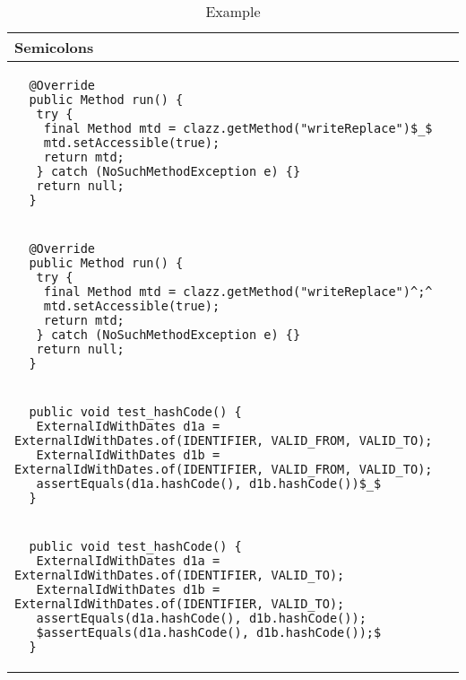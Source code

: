 \begin{table}[p]
\begin{tabular}{ | m{11cm} | }
  \hline
  Semicolons \\
  \hline
  \begin{lstlisting}
  @Override
  public Method run() {
   try {
    final Method mtd = clazz.getMethod("writeReplace")$_$
    mtd.setAccessible(true);
    return mtd;
   } catch (NoSuchMethodException e) {}
   return null;
  }
  \end{lstlisting} \\
  \begin{lstlisting}
  @Override
  public Method run() {
   try {
    final Method mtd = clazz.getMethod("writeReplace")^;^
    mtd.setAccessible(true);
    return mtd;
   } catch (NoSuchMethodException e) {}
   return null;
  }
  \end{lstlisting} \\
  \hline
  \hline
  \begin{lstlisting}
  public void test_hashCode() {
   ExternalIdWithDates d1a = ExternalIdWithDates.of(IDENTIFIER, VALID_FROM, VALID_TO);
   ExternalIdWithDates d1b = ExternalIdWithDates.of(IDENTIFIER, VALID_FROM, VALID_TO);
   assertEquals(d1a.hashCode(), d1b.hashCode())$_$
  }
  \end{lstlisting} \\
  \begin{lstlisting}
  public void test_hashCode() {
   ExternalIdWithDates d1a = ExternalIdWithDates.of(IDENTIFIER, VALID_TO);
   ExternalIdWithDates d1b = ExternalIdWithDates.of(IDENTIFIER, VALID_TO);
   assertEquals(d1a.hashCode(), d1b.hashCode());
   $assertEquals(d1a.hashCode(), d1b.hashCode());$
  }
  \end{lstlisting} \\
  \hline
\end{tabular}
\caption{Example}
\label{semicolon_showcase_table}
\end{table}

